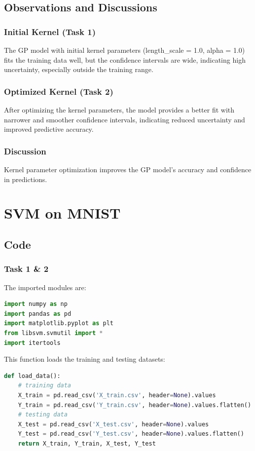 \documentclass{homework}
\begin{document}
\subsection{Observations and Discussions}

\subsubsection{Initial Kernel (Task 1)}
The GP model with initial kernel parameters (length\_scale = 1.0, alpha = 1.0) fits the training data well, but the confidence intervals are wide, indicating high uncertainty, especially outside the training range.

\subsubsection{Optimized Kernel (Task 2)}
After optimizing the kernel parameters, the model provides a better fit with narrower and smoother confidence intervals, indicating reduced uncertainty and improved predictive accuracy.

\subsubsection{Discussion}
Kernel parameter optimization improves the GP model’s accuracy and confidence in predictions.

\section{SVM on MNIST}

\subsection{Code}

\subsubsection{Task 1 \& 2}

The imported modules are:

\begin{lstlisting}[language=Python]
import numpy as np
import pandas as pd
import matplotlib.pyplot as plt
from libsvm.svmutil import *
import itertools
\end{lstlisting}

This function loads the training and testing datasets:

\begin{lstlisting}[language=Python]
def load_data():
    # training data
    X_train = pd.read_csv('X_train.csv', header=None).values
    Y_train = pd.read_csv('Y_train.csv', header=None).values.flatten()
    # testing data
    X_test = pd.read_csv('X_test.csv', header=None).values
    Y_test = pd.read_csv('Y_test.csv', header=None).values.flatten()
    return X_train, Y_train, X_test, Y_test
\end{lstlisting}
\end{document}
